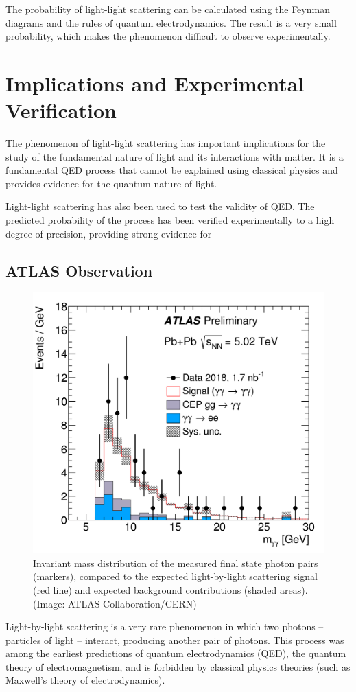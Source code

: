 \documentclass{paper}
\begin{document}
The probability of light-light scattering can be calculated using the Feynman diagrams and the rules of quantum electrodynamics. The result is a very small probability, which makes the phenomenon difficult to observe experimentally.

\section{Implications and Experimental Verification}

The phenomenon of light-light scattering has important implications for the study of the fundamental nature of light and its interactions with matter. It is a fundamental QED process that cannot be explained using classical physics and provides evidence for the quantum nature of light.

Light-light scattering has also been used to test the validity of QED.
The predicted probability of the process has been verified experimentally to a high degree of precision, providing strong evidence for

\subsection{ATLAS Observation}

\begin{figure}[ht]
	\centering
	\includegraphics[width=0.5\linewidth]{figures/LbyL-fig2.png}
	\caption{Invariant mass distribution of the measured final state photon pairs (markers), compared
		to the expected light-by-light scattering signal (red line) and expected background contributions
		(shaded areas). (Image: ATLAS Collaboration/CERN)}
	\label{fig:Atlas data}
\end{figure}
Light-by-light scattering is a very rare phenomenon in which two photons – particles of light – interact,
producing another pair of photons. This process was among the earliest predictions of quantum electrodynamics (QED),
the quantum theory of electromagnetism, and is forbidden by classical physics theories (such as
Maxwell's theory of electrodynamics).
\end{document}
